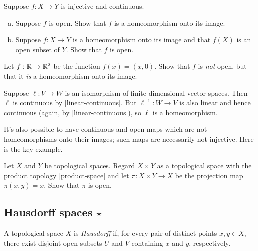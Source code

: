 \begin{exercise} \label{opens-and-homeomorphisms}
	Suppose $f : X \to Y$ is injective and continuous. 
	\begin{enumerate}[(a)]
		\item Suppose $f$ is open. Show that $f$ is a homeomorphism onto its image. 
		\item Suppose $f : X \to Y$ is a homeomorphism onto its image and that $f(X)$ is an open subset of $Y$. Show that $f$ is open. 
	\end{enumerate}
\end{exercise}

\begin{exercise}
	Let $f : \mathbb{R} \to \mathbb{R}^2$ be the function $f(x) = (x,0)$. Show that $f$ is \emph{not} open, but that it \emph{is} a homeomorphism onto its image. 
\end{exercise}

\begin{example} \label{linear-isomorphism-homeomorphism}
	Suppose $\ell : V \to W$ is an isomorphism of finite dimensional vector spaces. Then $\ell$ is continuous by \cref{linear-continuous}. But $\ell^{-1} : W \to V$ is also linear and hence continuous (again, by \cref{linear-continuous}), so $\ell$ is a homeomorphism. 
\end{example}

It's also possible to have continuous and open maps which are not homeomorphisms onto their images; such maps are necessarily not injective. Here is the key example. 

\begin{exercise} \label{projections-are-open}
	Let $X$ and $Y$ be topological spaces. Regard $X \times Y$ as a topological space with the product topology \ref{product-space} and let $\pi : X \times Y \to X$ be the projection map $\pi(x,y) = x$. Show that $\pi$ is open. 
\end{exercise}

\subsection{Hausdorff spaces \texorpdfstring{$\star$}{*}}

\begin{definition}[Hausdorff] 
	A topological space $X$ is \emph{Hausdorff} if, for every pair of distinct points $x, y \in X$, there exist disjoint open subsets $U$ and $V$ containing $x$ and $y$, respectively. 
\end{definition}

